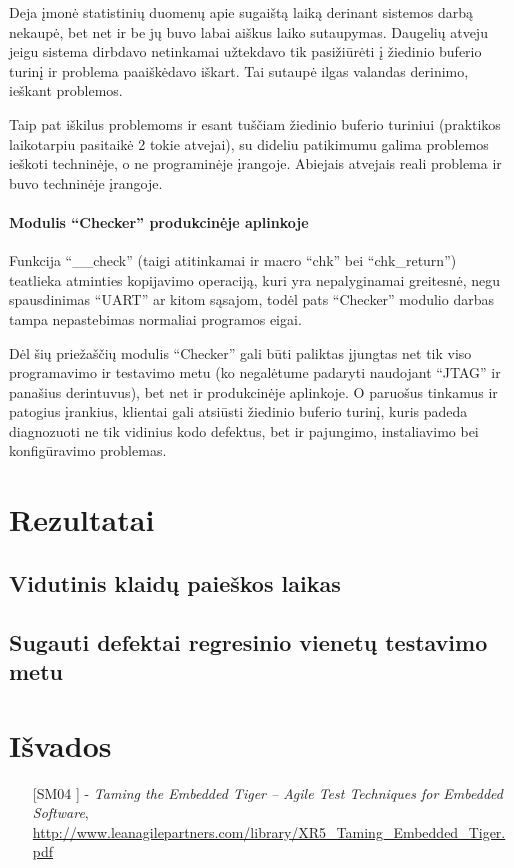 \documentclass[12pt, a4paper, lithuanian, final]{article}
\begin{document}
Deja įmonė statistinių duomenų apie sugaištą laiką derinant sistemos darbą nekaupė, bet net ir be jų buvo labai aiškus laiko sutaupymas.
Daugelių atveju jeigu sistema dirbdavo netinkamai užtekdavo tik pasižiūrėti į žiedinio buferio turinį ir problema paaiškėdavo iškart. Tai sutaupė ilgas valandas derinimo, ieškant problemos.


Taip pat iškilus problemoms ir esant tuščiam žiedinio buferio turiniui (praktikos laikotarpiu pasitaikė 2 tokie atvejai), su dideliu patikimumu galima problemos ieškoti techninėje, o ne programinėje įrangoje.
Abiejais atvejais reali problema ir buvo techninėje įrangoje.


\paragraph{Modulis "`Checker"' produkcinėje aplinkoje} Funkcija "`\_\_check"' (taigi atitinkamai ir macro "`chk"' bei "`chk\_return"') teatlieka atminties kopijavimo operaciją, kuri yra nepalyginamai greitesnė, negu spausdinimas "`UART"' ar kitom sąsajom, todėl pats "`Checker"' modulio darbas tampa nepastebimas normaliai programos eigai.

Dėl šių priežaščių modulis "`Checker"' gali būti paliktas įjungtas net tik viso programavimo ir testavimo metu (ko negalėtume padaryti naudojant "`JTAG"' ir panašius derintuvus), bet net ir produkcinėje aplinkoje. O paruošus tinkamus ir patogius įrankius, klientai gali atsiūsti žiedinio buferio turinį, kuris padeda diagnozuoti ne tik vidinius kodo defektus, bet ir pajungimo, instaliavimo bei konfigūravimo problemas.


















\section{Rezultatai}


\subsection{Vidutinis klaidų paieškos laikas}

\subsection{Sugauti defektai regresinio vienetų testavimo metu}



\section{Išvados}


\begin{itemize}
	\item [[SM04]] - \textit{Taming the Embedded Tiger – Agile Test Techniques for Embedded Software}, \url{http://www.leanagilepartners.com/library/XR5_Taming_Embedded_Tiger.pdf}

\end{itemize}
\end{document}
